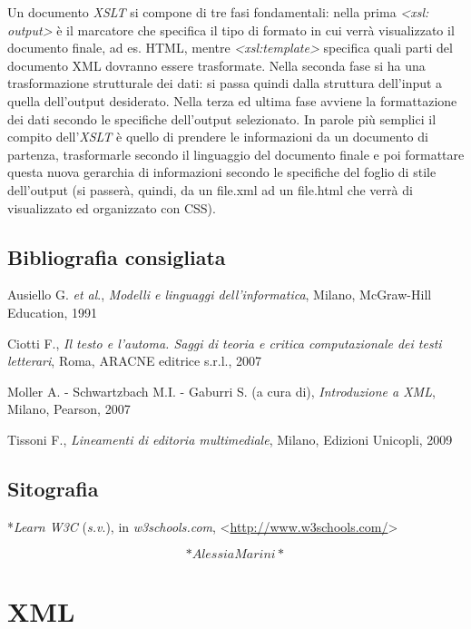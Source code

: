 \documentclass[
  b5paper,
  twoside,
  11pt,
  chapterprefix=false,
  bibliography=totocnumbered,
  parskip=0]{scrbook}
\begin{document}
Un documento \emph{XSLT} si compone di tre fasi fondamentali: nella prima
\emph{\textless xsl: output\textgreater{}} è il marcatore che specifica il tipo di formato in cui
verrà visualizzato il documento finale, ad es. HTML, mentre
\emph{\textless xsl:template\textgreater{}} specifica quali parti del documento XML dovranno
essere trasformate. Nella seconda fase si ha una trasformazione
strutturale dei dati: si passa quindi dalla struttura dell'input a
quella dell'output desiderato. Nella terza ed ultima fase avviene la
formattazione dei dati secondo le specifiche dell'output selezionato. In
parole più semplici il compito dell'\emph{XSLT} è quello di prendere le
informazioni da un documento di partenza, trasformarle secondo il
linguaggio del documento finale e poi formattare questa nuova gerarchia
di informazioni secondo le specifiche del foglio di stile dell'output
(si passerà, quindi, da un file.xml ad un file.html che verrà di
visualizzato ed organizzato con CSS).

\hypertarget{bibliografia-consigliata-27}{%
\section*{Bibliografia consigliata}\label{bibliografia-consigliata-27}}

Ausiello G. \emph{et al}., \emph{Modelli e linguaggi dell'informatica}, Milano,
McGraw-Hill Education, 1991

Ciotti F., \emph{Il testo e l'automa. Saggi di teoria e critica
computazionale dei testi letterari}, Roma, ARACNE editrice s.r.l., 2007

Moller A. - Schwartzbach M.I. - Gaburri S. (a cura di), \emph{Introduzione a
XML}, Milano, Pearson, 2007

Tissoni F., \emph{Lineamenti di editoria multimediale}, Milano, Edizioni
Unicopli, 2009

\hypertarget{sitografia-34}{%
\section*{Sitografia}\label{sitografia-34}}

*\emph{Learn W3C} (\emph{s.v}.), in \emph{w3schools.com},
\textless{}{\url{http://www.w3schools.com/}\textgreater{}}

\[*Alessia Marini*\]

\hypertarget{xml}{%
\chapter{XML}\label{xml}}
\end{document}
